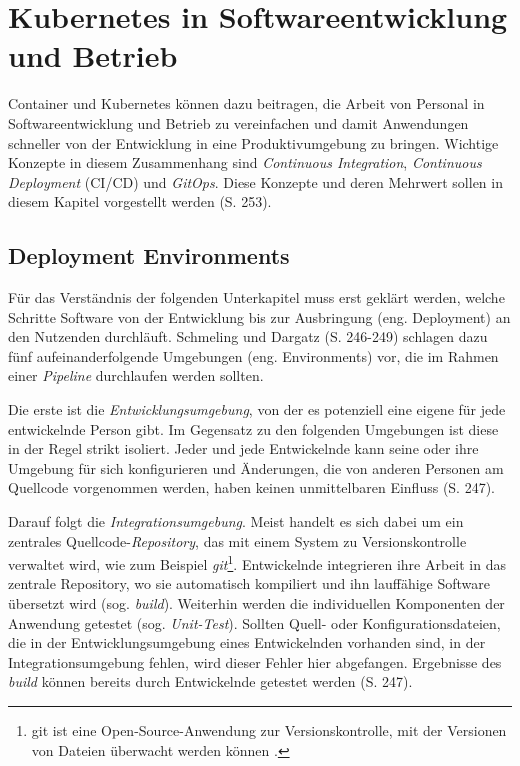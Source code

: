 \documentclass[11pt,a4paper]{article}
\begin{document}
\section{Kubernetes in Softwareentwicklung und Betrieb}
\label{sec:devops}
Container und Kubernetes können dazu beitragen, die Arbeit von Personal in Softwareentwicklung und
Betrieb zu vereinfachen und damit Anwendungen schneller von der Entwicklung
in eine Produktivumgebung zu bringen.
Wichtige Konzepte in diesem Zusammenhang sind
\emph{Continuous Integration}, \emph{Continuous Deployment} (CI/CD)
und \emph{GitOps}. Diese Konzepte und deren Mehrwert sollen in diesem Kapitel vorgestellt werden \cite{domingus2022cloud} (S. 253).

\subsection{Deployment Environments}
Für das Verständnis der folgenden Unterkapitel muss erst geklärt werden,
welche Schritte Software von der Entwicklung bis zur Ausbringung (eng. Deployment) an den
Nutzenden durchläuft.
Schmeling und Dargatz \cite{Schmeling_Dargatz_2022} (S. 246-249) schlagen dazu
fünf aufeinanderfolgende Umgebungen (eng. Environments) vor, die im Rahmen
einer \emph{Pipeline} durchlaufen werden sollten.

Die erste ist die \emph{Entwicklungsumgebung}, von der es potenziell
eine eigene für jede entwickelnde Person gibt. Im Gegensatz zu den folgenden
Umgebungen ist diese in der Regel strikt isoliert. Jeder und jede Entwickelnde
kann seine oder ihre Umgebung für sich konfigurieren und Änderungen, die von anderen
Personen am Quellcode vorgenommen werden, haben keinen unmittelbaren Einfluss \cite{Schmeling_Dargatz_2022} (S. 247).

Darauf folgt die \emph{Integrationsumgebung}. Meist handelt es sich dabei
um ein zentrales Quellcode-\emph{Repository}, das mit einem System zu Versionskontrolle
verwaltet wird, wie zum Beispiel 
\emph{git}\footnote{git ist eine Open-Source-Anwendung zur Versionskontrolle, mit der Versionen von Dateien überwacht werden können \cite{chacon2014pro}.}.
Entwickelnde integrieren ihre Arbeit in das zentrale Repository, wo sie
automatisch kompiliert und ihn lauffähige Software übersetzt wird (sog. \emph{build}).
Weiterhin werden die individuellen Komponenten der Anwendung getestet (sog. \emph{Unit-Test}).
Sollten Quell- oder Konfigurationsdateien, die in der Entwicklungsumgebung
eines Entwickelnden vorhanden sind, in der Integrationsumgebung fehlen,
wird dieser Fehler hier abgefangen.
Ergebnisse des \emph{build} können bereits durch Entwickelnde getestet werden \cite{Schmeling_Dargatz_2022} (S. 247).
\end{document}
